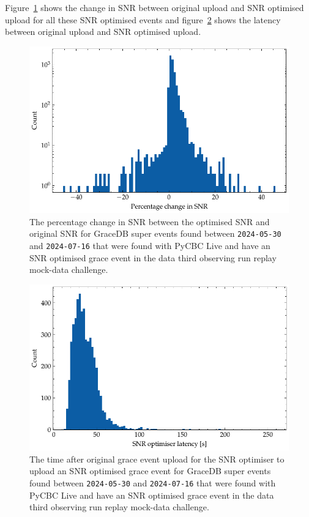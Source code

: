 Figure~\ref{7:fig:snr-diffs} shows the change in SNR between original upload and SNR optimised upload for all these SNR optimised events and figure~\ref{7:fig:latencies} shows the latency between original upload and SNR optimised upload.
%
\begin{figure}
    \centering
    \includegraphics[width=1.0\linewidth]{images/7_snr_optimiser/snr_diffs.pdf}
    \caption{The percentage change in SNR between the optimised SNR and original SNR for GraceDB super events found between \texttt{2024-05-30} and \texttt{2024-07-16} that were found with PyCBC Live and have an SNR optimised grace event in the \gwadj data third observing run replay mock-data challenge.}
    \label{7:fig:snr-diffs}
\end{figure}
%
\begin{figure}
    \centering
    \includegraphics[width=1.0\linewidth]{images/7_snr_optimiser/latencies.pdf}
    \caption{The time after original grace event upload for the SNR optimiser to upload an SNR optimised grace event for GraceDB super events found between \texttt{2024-05-30} and \texttt{2024-07-16} that were found with PyCBC Live and have an SNR optimised grace event in the \gwadj data third observing run replay mock-data challenge.}
    \label{7:fig:latencies}
\end{figure}
